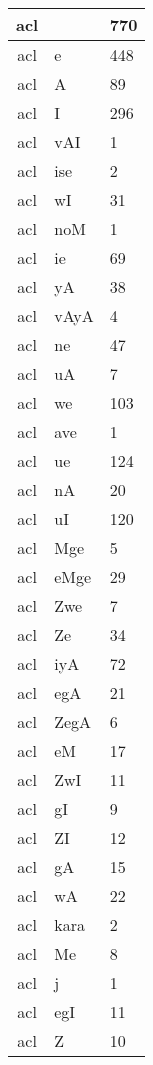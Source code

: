 \documentclass[a4 paper]{article}
\begin{document}
\begin{longtable}{cp{}p{}}
acl &  & 770\\ \midrule acl & e & 448\\ \midrule acl & A & 89\\ \midrule acl & I & 296\\ \midrule acl & vAI & 1\\ \midrule acl & ise & 2\\ \midrule acl & wI & 31\\ \midrule acl & noM & 1\\ \midrule acl & ie & 69\\ \midrule acl & yA & 38\\ \midrule acl & vAyA & 4\\ \midrule acl & ne & 47\\ \midrule acl & uA & 7\\ \midrule acl & we & 103\\ \midrule acl & ave & 1\\ \midrule acl & ue & 124\\ \midrule acl & nA & 20\\ \midrule acl & uI & 120\\ \midrule acl & Mge & 5\\ \midrule acl & eMge & 29\\ \midrule acl & Zwe & 7\\ \midrule acl & Ze & 34\\ \midrule acl & iyA & 72\\ \midrule acl & egA & 21\\ \midrule acl & ZegA & 6\\ \midrule acl & eM & 17\\ \midrule acl & ZwI & 11\\ \midrule acl & gI & 9\\ \midrule acl & ZI & 12\\ \midrule acl & gA & 15\\ \midrule acl & wA & 22\\ \midrule acl & kara & 2\\ \midrule acl & Me & 8\\ \midrule acl & j & 1\\ \midrule acl & egI & 11\\ \midrule acl & Z & 10\\ 
\end{longtable}
\end{document}
